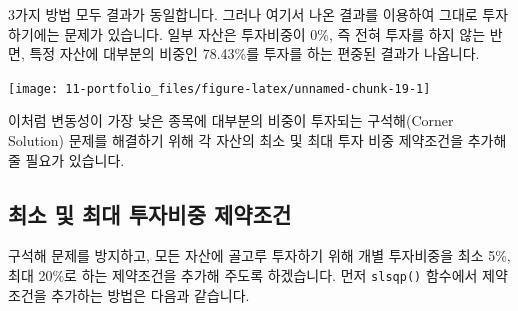 \documentclass[12pt,]{book}
\newenvironment{Shaded}{\begin{snugshade}}{\end{snugshade}}
\newcommand{\DataTypeTok}[1]{\textcolor[rgb]{0.13,0.29,0.53}{#1}}
\newcommand{\DecValTok}[1]{\textcolor[rgb]{0.00,0.00,0.81}{#1}}
\newcommand{\KeywordTok}[1]{\textcolor[rgb]{0.13,0.29,0.53}{\textbf{#1}}}
\newcommand{\NormalTok}[1]{#1}
\newcommand{\OperatorTok}[1]{\textcolor[rgb]{0.81,0.36,0.00}{\textbf{#1}}}
\newcommand{\OtherTok}[1]{\textcolor[rgb]{0.56,0.35,0.01}{#1}}
\newcommand{\StringTok}[1]{\textcolor[rgb]{0.31,0.60,0.02}{#1}}
\begin{document}
3가지 방법 모두 결과가 동일합니다. 그러나 여기서 나온 결과를 이용하여 그대로 투자하기에는 문제가 있습니다. 일부 자산은 투자비중이 0\%, 즉 전혀 투자를 하지 않는 반면, 특정 자산에 대부분의 비중인 78.43\%를 투자를 하는 편중된 결과가 나옵니다.

\begin{Shaded}
\end{Shaded}

\begin{center}\texttt{[image: 11-portfolio\_files/figure-latex/unnamed-chunk-19-1]} \end{center}

이처럼 변동성이 가장 낮은 종목에 대부분의 비중이 투자되는 구석해(Corner Solution) 문제를 해결하기 위해 각 자산의 최소 및 최대 투자 비중 제약조건을 추가해 줄 필요가 있습니다.

\hypertarget{section-71}{%
\subsection{최소 및 최대 투자비중 제약조건}\label{section-71}}

구석해 문제를 방지하고, 모든 자산에 골고루 투자하기 위해 개별 투자비중을 최소 5\%, 최대 20\%로 하는 제약조건을 추가해 주도록 하겠습니다. 먼저 \texttt{slsqp()} 함수에서 제약조건을 추가하는 방법은 다음과 같습니다.
\end{document}
